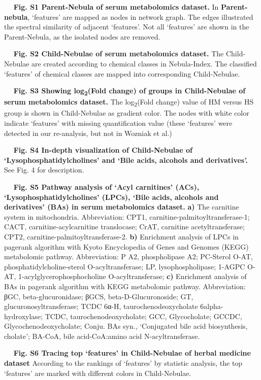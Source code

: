 \documentclass[
]{article}
\begin{document}
   \textbf{Fig. S1 \textbar{} Parent-Nebula of serum metabolomics
dataset.} In \textbf{Parent-nebula}, `features' are mapped as nodes in
network graph. The edges illustrated the spectral similarity of adjacent
`features'. Not all `features' are shown in the Parent-Nebula, as the
isolated nodes are removed.

   \textbf{Fig. S2 \textbar{} Child-Nebulae of serum metabolomics
dataset.} The Child-Nebulae are created according to chemical classes in
Nebula-Index. The classified `features' of chemical classes are mapped
into corresponding Child-Nebulae.

   \textbf{Fig. S3 \textbar{} Showing log\textsubscript{2}(Fold change)
of groups in Child-Nebulae of serum metabolomics dataset.} The
log\textsubscript{2}(Fold change) value of HM versus HS group is shown
in Child-Nebulae as gradient color. The nodes with white color indicate
`features' with missing quantification value (these `features' were
detected in our re-analysis, but not in Wozniak et al.)

   \textbf{Fig. S4 \textbar{} In-depth visualization of Child-Nebulae of
`Lysophosphatidylcholines' and `Bile acids, alcohols and derivatives'.}
See Fig. 4 for description.

   \textbf{Fig. S5 \textbar{} Pathway analysis of `Acyl carnitines'
(ACs), `Lysophosphatidylcholines' (LPCs), `Bile acids, alcohols and
derivatives' (BAs) in serum metabolomics dataset.} \textbf{a)} The
carnitine system in mitochondria. Abbreviation: CPT1,
carnitine-palmitoyltransferase-1; CACT, carnitine-acylcarnitine
translocase; CrAT, carnitine acetyltransferase; CPT2,
carnitine-palmitoyltransferase-2. \textbf{b)} Enrichment analysis of
LPCs in pagerank algorithm with Kyoto Encyclopedia of Genes and Genomes
(KEGG) metabolomic pathway. Abbreviation: P A2, phospholipase A2;
PC-Sterol O-AT, phosphatidylcholine-sterol O-acyltransferase; LP,
lysophospholipase; 1-AGPC O-AT, 1-acylglycerophosphocholine
O-acyltransferase; \textbf{c)} Enrichment analysis of BAs in pagerank
algorithm with KEGG metabolomic pathway. Abbreviation: βGC,
beta-glucuronidase; βGCS, beta-D-Glucuronoside; GT,
glucuronosyltransferase; TCDC 6α-H, taurochenodeoxycholate
6alpha-hydroxylase; TCDC, taurochenodeoxycholate; GCC, Glycocholate;
GCCDC, Glycochenodeoxycholate; Conju. BAs syn., `Conjugated bile acid
biosynthesis, cholate'; BA-CoA, bile acid-CoA:amino acid
N-acyltransferase.

   \textbf{Fig. S6 \textbar{} Tracing top `features' in Child-Nebulae of
herbal medicine dataset} According to the rankings of `features' by
statistic analysis, the top `features' are marked with different colors
in Child-Nebulae.
\end{document}
